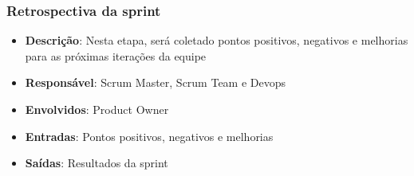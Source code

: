 \subsubsection{Retrospectiva da sprint}

\begin{itemize}
  \item \textbf{Descrição}: Nesta etapa, será coletado pontos positivos, negativos e melhorias para as próximas iterações da equipe
  \item \textbf{Responsável}: Scrum Master, Scrum Team e Devops
  \item \textbf{Envolvidos}: Product Owner
  \item \textbf{Entradas}: Pontos positivos, negativos e melhorias
  \item \textbf{Saídas}: Resultados da sprint
\end{itemize}

